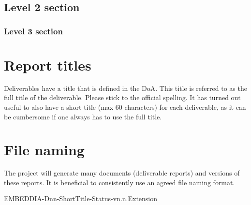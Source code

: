 \documentclass[10pt]{report}
\begin{document}
\lipsum[1]

\subsection{Level 2 section}

\lipsum[1]

\subsubsection{Level 3 section}

\lipsum[1]


\section{ Report titles}

Deliverables have a title that is defined in the DoA. This title is referred to as the full title of the deliverable. Please stick to the official spelling. It has turned out useful to also have a short title (max 60 characters) for each deliverable, as it can be cumbersome if one always has to use the full title. 

\section{File naming}

The project will generate many documents (deliverable reports) and versions of these reports. It is beneficial to consistently use an agreed file naming format. 

EMBEDDIA-Dnn-ShortTitle-Status-vn.n.Extension
\end{document}
